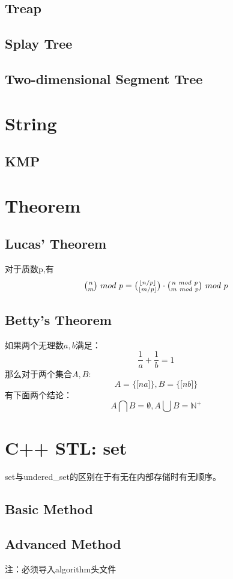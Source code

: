 \documentclass[10pt,UTF8,a4paper,twoside]{ctexart}
\begin{document}
\begin{multicols}{2}
	\subsection{Treap}
	\subsection{Splay Tree}
	\subsection{Two-dimensional Segment Tree}
\clearpage

\section{String}
	\subsection{KMP}
		
\clearpage


\begin{appendices}
	\section{Theorem}
		\large
		\subsection{Lucas' Theorem}
			对于质数p,有
			$$
				\tbinom{n}{m} \ mod \ p = \tbinom{\lfloor n/p \rfloor}{\lfloor m/p \rfloor}
				\cdot \tbinom{n \ mod \ p}{m \ mod \ p} \ mod \ p
			$$
		\subsection{Betty's Theorem}
			如果两个无理数$a,b$满足：
			$$ \frac{1}{a}+\frac{1}{b}=1$$
			那么对于两个集合$A,B$:
			$$A=\lbrace \lbrack na \rbrack \rbrace,B=\lbrace \lbrack nb \rbrack \rbrace$$
			有下面两个结论：
			$$A \bigcap B = \emptyset,A \bigcup B = \mathbb{N}^+$$
	\section{C++ STL: set}
		\large
		set与undered\_set的区别在于有无在内部存储时有无顺序。
		\subsection{Basic Method}
			
		\subsection{Advanced Method}
			注：必须导入algorithm头文件
			
		
\end{appendices}

\end{multicols}
\end{document}
